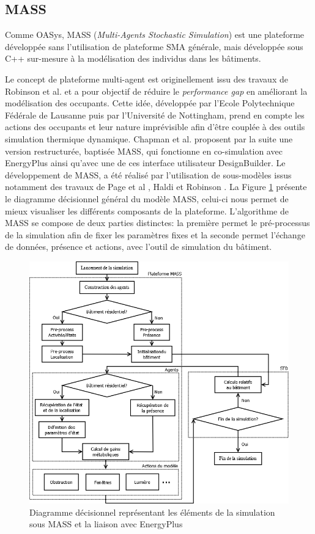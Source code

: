 \subsection{MASS}
\label{FlowchartInternMASS}

Comme OASys, MASS (\textit{Multi-Agents Stochastic Simulation}) est une plateforme développée sans l'utilisation de plateforme SMA générale, mais développée sous C++ sur-mesure à la modélisation des individus dans les bâtiments. 

Le concept de plateforme multi-agent est originellement issu des travaux de Robinson et al. \cite{Robinson-11} et a pour objectif de réduire le \textit{performance gap} en améliorant la modélisation des occupants. Cette idée, développée par l'Ecole Polytechnique Fédérale de Lausanne puis par l'Université de Nottingham, prend en compte les actions des occupants et leur nature imprévisible afin d'être couplée à des outils simulation thermique dynamique. Chapman et al. \cite{Chapman-14} proposent par la suite une version restructurée, baptisée MASS, qui fonctionne en co-simulation avec EnergyPlus ainsi qu'avec une de ces interface utilisateur DesignBuilder. Le développement de MASS, a été réalisé par l'utilisation de sous-modèles issus notamment des travaux de Page et al \cite{Page-08}, Haldi et Robinson \cite{Haldi-09} \cite{Haldi-10}. La Figure \ref{fig:Diagramme_MASS} présente le diagramme décisionnel général du modèle MASS, celui-ci nous permet de mieux visualiser les différents composants de la plateforme. L'algorithme de MASS se compose de deux parties distinctes: la première permet le pré-processus de la simulation afin de fixer les paramètres fixes et la seconde permet l'échange de données, présence et actions, avec l'outil de simulation du bâtiment.

\begin{figure}[H]
\centering
\includegraphics[scale=0.4]{Images/diagrammes_SMA/MASS}
\caption{Diagramme décisionnel représentant les éléments de la simulation sous MASS et la liaison avec EnergyPlus}
\label{fig:Diagramme_MASS}
\end{figure}

